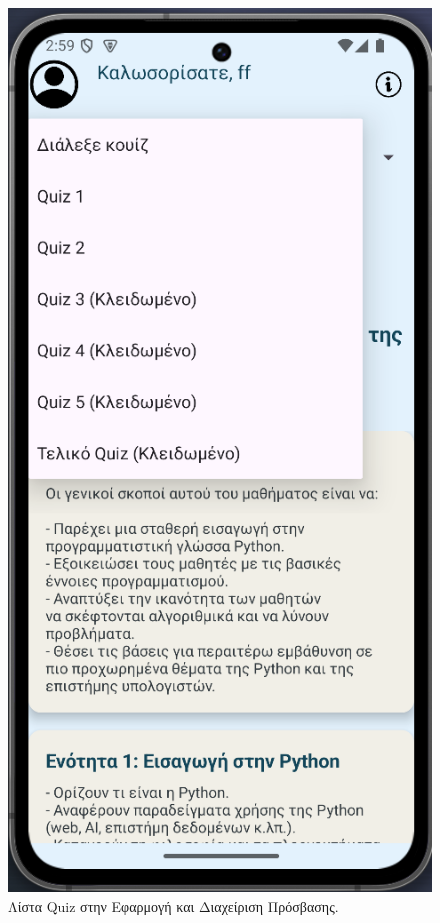\documentclass[11pt]{report}
\begin{document}
\begin{figure}[H]
  \centering
  \includegraphics[width=0.9\linewidth, height=0.35\textheight, keepaspectratio]{Figures/s8.png}
  \caption{Λίστα Quiz στην Εφαρμογή και Διαχείριση Πρόσβασης.}
\end{figure}
\end{document}
